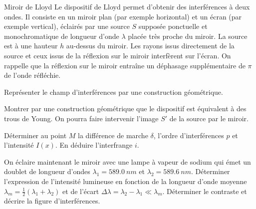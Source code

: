 \begin{exo}[PC][1]{Miroir de Lloyd}
Le dispositif de Lloyd permet d'obtenir des interférences à deux ondes. Il consiste en un miroir plan (par exemple horizontal) et un écran (par exemple vertical), éclairés par une source $S$ supposée ponctuelle et monochromatique de longueur d'onde $\lambda$ placée très proche du miroir. La source est à une hauteur $h$ au-dessus du miroir. Les rayons issus directement de la source et ceux issus de la réflexion sur le miroir interfèrent sur l'écran. On rappelle que la réflexion sur le miroir entraîne un déphasage supplémentaire de $\pi$ de l'onde réfléchie.
\begin{quest}
\item Représenter le champ d'interférences par une construction géométrique.
\item Montrer par une construction géométrique que le dispositif est équivalent à des trous de Young. On pourra faire intervenir l'image $S'$ de la source par le miroir.
\item Déterminer au point $M$ la différence de marche $\delta$, l'ordre d'interférences $p$ et l'intensité $I(x)$. En déduire l'interfrange $i$.
\item On éclaire maintenant le miroir avec une lampe à vapeur de sodium qui émet un doublet de longueur d'ondes $\lambda_1=\SI{589,0}{nm}$ et $\lambda_2=\SI{589,6}{nm}$. Déterminer l'expression de l'intensité lumineuse en fonction de la longueur d'onde moyenne $\lambda_m = \frac{1}{2}( \lambda_1 + \lambda_2)$ et de l'écart $\Delta \lambda = \lambda_2 - \lambda_1 \ll \lambda_m$. Déterminer le contraste et décrire la figure d'interférences.
\end{quest}
\end{exo}

